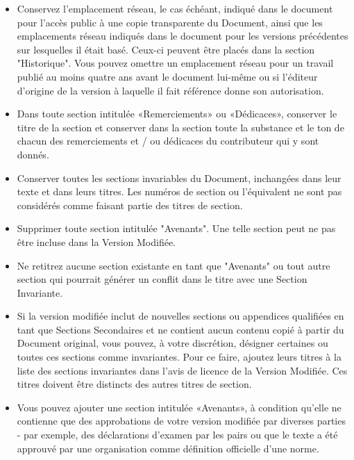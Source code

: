 \begin{itemize}
		\item Conservez l'emplacement réseau, le cas échéant, indiqué dans le document pour l'accès public à une copie transparente du Document, ainsi que les emplacements réseau indiqués dans le document pour les versions précédentes sur lesquelles il était basé. Ceux-ci peuvent être placés dans la section "Historique". Vous pouvez omettre un emplacement réseau pour un travail publié au moins quatre ans avant le document lui-même ou si l'éditeur d'origine de la version à laquelle il fait référence donne son autorisation.

		\item Dans toute section intitulée «Remerciements» ou «Dédicaces», conserver le titre de la section et conserver dans la section toute la substance et le ton de chacun des remerciements et / ou dédicaces du contributeur qui y sont donnés.

		\item Conserver toutes les sections invariables du Document, inchangées dans leur texte et dans leurs titres. Les numéros de section ou l'équivalent ne sont pas considérés comme faisant partie des titres de section.

		\item  Supprimer toute section intitulée "Avenants". Une telle section peut ne pas être incluse dans la Version Modifiée.

		\item Ne retitrez aucune section existante en tant que "Avenants" ou tout autre section qui pourrait générer un conflit dans le titre avec une Section Invariante.

		\item Si la version modifiée inclut de nouvelles sections ou appendices qualifiées en tant que Sections Secondaires et ne contient aucun contenu copié à partir du Document original, vous pouvez, à votre discrétion, désigner certaines ou toutes ces sections comme invariantes. Pour ce faire, ajoutez leurs titres à la liste des sections invariantes dans l'avis de licence de la Version Modifiée. Ces titres doivent être distincts des autres titres de section.

		\item Vous pouvez ajouter une section intitulée «Avenants», à condition qu'elle ne contienne que des approbations de votre version modifiée par diverses parties - par exemple, des déclarations d'examen par les pairs ou que le texte a été approuvé par une organisation comme définition officielle d'une norme.


\end{itemize}
